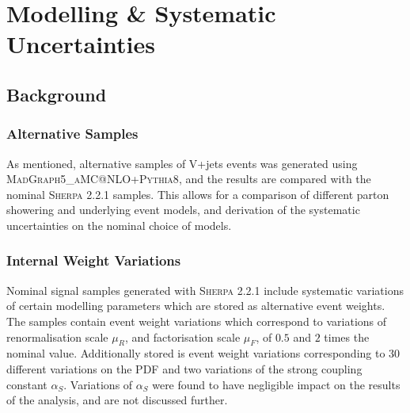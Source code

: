 \section{Modelling \& Systematic Uncertainties}\label{sec:vhbb_modelling}

\subsection{Background}

%

%
\subsubsection{Alternative Samples}
As mentioned, alternative samples of V+jets events was generated using \textsc{MadGraph5\_aMC@NLO+Pythia8}, and the results are compared with the nominal \textsc{Sherpa 2.2.1} samples. This allows for a comparison of different parton showering and underlying event models, and derivation of the systematic uncertainties on the nominal choice of models.

\subsubsection{Internal Weight Variations}
Nominal signal samples generated with \textsc{Sherpa 2.2.1} include systematic variations of certain modelling parameters which are stored as alternative event weights. The samples contain event weight variations which correspond to variations of renormalisation scale $\mu_R$, and factorisation scale $\mu_F$, of $0.5$ and $2$ times the nominal value. Additionally stored is event weight variations corresponding to $30$ different variations on the PDF and two variations of the strong coupling constant $\alpha_S$. Variations of $\alpha_S$ were found to have negligible impact on the results of the analysis, and are not discussed further. 

